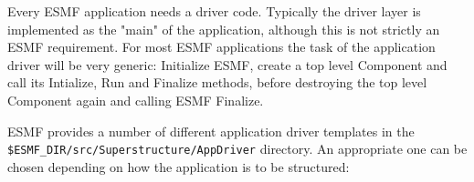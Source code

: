 %


Every ESMF application needs a driver code. Typically the driver layer is
implemented as the "main" of the application, although this is not strictly an
ESMF requirement. For most ESMF applications the task of the application driver
will be very generic: Initialize ESMF, create a top level Component and call its
Intialize, Run and Finalize methods, before destroying the top level Component
again and calling ESMF Finalize.

\begin{sloppypar}
ESMF provides a number of different application driver templates in the
{\tt \$ESMF\_DIR/src/Superstructure/AppDriver} directory. An appropriate one 
can be chosen depending on how the application is to be structured:
\end{sloppypar}

